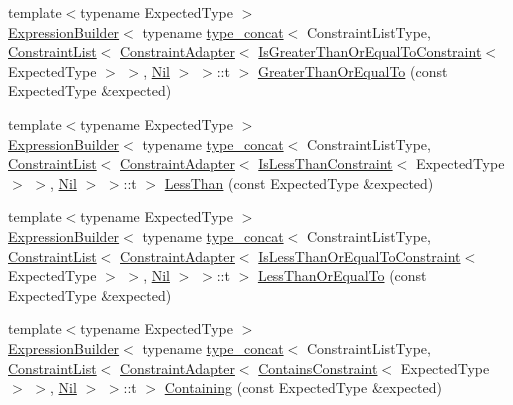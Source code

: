 \begin{DoxyCompactItemize}
\item 
{\footnotesize template$<$typename Expected\+Type $>$ }\\\mbox{\hyperlink{structsnowhouse_1_1ExpressionBuilder}{Expression\+Builder}}$<$ typename \mbox{\hyperlink{structsnowhouse_1_1type__concat}{type\+\_\+concat}}$<$ Constraint\+List\+Type, \mbox{\hyperlink{structsnowhouse_1_1ConstraintList}{Constraint\+List}}$<$ \mbox{\hyperlink{structsnowhouse_1_1ConstraintAdapter}{Constraint\+Adapter}}$<$ \mbox{\hyperlink{structsnowhouse_1_1IsGreaterThanOrEqualToConstraint}{Is\+Greater\+Than\+Or\+Equal\+To\+Constraint}}$<$ Expected\+Type $>$ $>$, \mbox{\hyperlink{structsnowhouse_1_1Nil}{Nil}} $>$ $>$\+::t $>$ \mbox{\hyperlink{structsnowhouse_1_1ExpressionBuilder_aa90fe0955f1e2b31080709c41f682726}{Greater\+Than\+Or\+Equal\+To}} (const Expected\+Type \&expected)
\item 
{\footnotesize template$<$typename Expected\+Type $>$ }\\\mbox{\hyperlink{structsnowhouse_1_1ExpressionBuilder}{Expression\+Builder}}$<$ typename \mbox{\hyperlink{structsnowhouse_1_1type__concat}{type\+\_\+concat}}$<$ Constraint\+List\+Type, \mbox{\hyperlink{structsnowhouse_1_1ConstraintList}{Constraint\+List}}$<$ \mbox{\hyperlink{structsnowhouse_1_1ConstraintAdapter}{Constraint\+Adapter}}$<$ \mbox{\hyperlink{structsnowhouse_1_1IsLessThanConstraint}{Is\+Less\+Than\+Constraint}}$<$ Expected\+Type $>$ $>$, \mbox{\hyperlink{structsnowhouse_1_1Nil}{Nil}} $>$ $>$\+::t $>$ \mbox{\hyperlink{structsnowhouse_1_1ExpressionBuilder_a72113342b074aafb3fb2651350300b87}{Less\+Than}} (const Expected\+Type \&expected)
\item 
{\footnotesize template$<$typename Expected\+Type $>$ }\\\mbox{\hyperlink{structsnowhouse_1_1ExpressionBuilder}{Expression\+Builder}}$<$ typename \mbox{\hyperlink{structsnowhouse_1_1type__concat}{type\+\_\+concat}}$<$ Constraint\+List\+Type, \mbox{\hyperlink{structsnowhouse_1_1ConstraintList}{Constraint\+List}}$<$ \mbox{\hyperlink{structsnowhouse_1_1ConstraintAdapter}{Constraint\+Adapter}}$<$ \mbox{\hyperlink{structsnowhouse_1_1IsLessThanOrEqualToConstraint}{Is\+Less\+Than\+Or\+Equal\+To\+Constraint}}$<$ Expected\+Type $>$ $>$, \mbox{\hyperlink{structsnowhouse_1_1Nil}{Nil}} $>$ $>$\+::t $>$ \mbox{\hyperlink{structsnowhouse_1_1ExpressionBuilder_a352da05ec10ff1b6daa2fd3c5f2fad80}{Less\+Than\+Or\+Equal\+To}} (const Expected\+Type \&expected)
\item 
{\footnotesize template$<$typename Expected\+Type $>$ }\\\mbox{\hyperlink{structsnowhouse_1_1ExpressionBuilder}{Expression\+Builder}}$<$ typename \mbox{\hyperlink{structsnowhouse_1_1type__concat}{type\+\_\+concat}}$<$ Constraint\+List\+Type, \mbox{\hyperlink{structsnowhouse_1_1ConstraintList}{Constraint\+List}}$<$ \mbox{\hyperlink{structsnowhouse_1_1ConstraintAdapter}{Constraint\+Adapter}}$<$ \mbox{\hyperlink{structsnowhouse_1_1ContainsConstraint}{Contains\+Constraint}}$<$ Expected\+Type $>$ $>$, \mbox{\hyperlink{structsnowhouse_1_1Nil}{Nil}} $>$ $>$\+::t $>$ \mbox{\hyperlink{structsnowhouse_1_1ExpressionBuilder_a28b4521bdfa03766c77cbf08aae7943c}{Containing}} (const Expected\+Type \&expected)

\end{DoxyCompactItemize}
